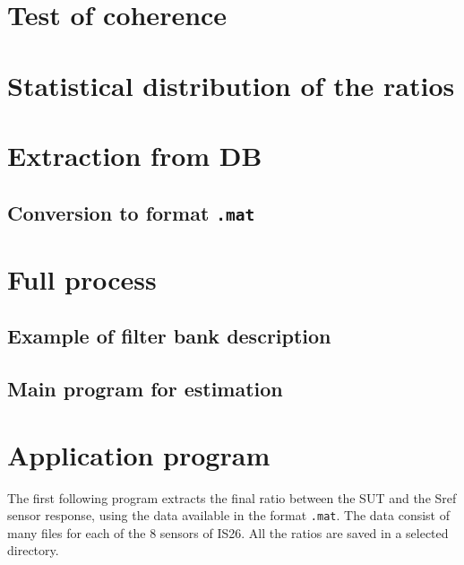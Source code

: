 \documentclass[a4paper, 12pt]{report}
\begin{document}
  \newpage
  \section{Test of coherence}
{\tiny }
 
 \newpage
 \section{Statistical distribution of the ratios}
{\tiny }

  
\newpage
  \section{Extraction from DB}
  
{\tiny }

\subsection{Conversion to format {\tt .mat}}
{\tiny }

{\tiny }



\newpage
  \section{Full process}


  \subsection{Example of filter bank description}
{\tiny }

\subsection{Main program for estimation}
{\tiny }


\section{Application program}
The first following program extracts the final ratio between the SUT and the Sref sensor response, using the data available in the format {\tt .mat}. The data consist of many files for each of the 8 sensors of IS26. All the ratios are saved in a selected directory.
\end{document}
